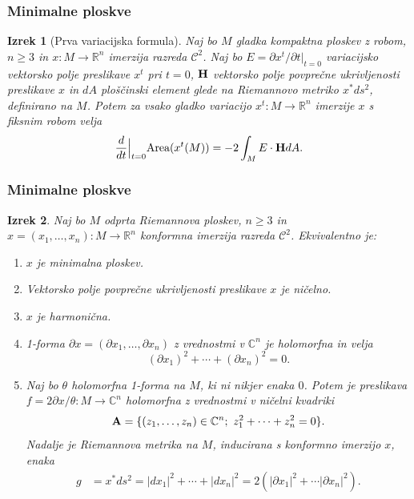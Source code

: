 \documentclass[9pt, table]{beamer}
\newtheorem{izrek}{Izrek}
\newcommand{\R}{\mathbb R}
\newcommand{\C}{\mathbb C}
\begin{document}
\begin{frame}
\frametitle{Minimalne ploskve}

\begin{izrek}[Prva variacijska formula] \label{izr:1-var-formula}
Naj bo $M$ gladka kompaktna ploskev z robom, $n \geq 3$ in $x \colon M \to \R^{n}$ imerzija razreda $\mathcal{C}^2$. Naj bo $E = \partial{x^{t}} / \partial{t}|_{t=0}$ variacijsko vektorsko polje preslikave $x^{t}$ pri $t=0$, $\textbf{\textup{H}}$ vektorsko polje povprečne ukrivljenosti preslikave $x$ in $dA$ ploščinski element glede na Riemannovo metriko $x^{*}ds^2$, definirano na $M$.
Potem za vsako gladko variacijo $x^{t} \colon M \to \R^{n}$ imerzije $x$ s fiksnim robom velja
\begin{equation} \label{eq:1-var-formula}
\frac{d}{dt} \Big|_{t=0} \text{Area}(x^{t}(M)) = -2 \int_{M} {E \cdot \textbf{\textup{H}} dA}.
\end{equation}
\end{izrek}

\end{frame}


\begin{frame}
\frametitle{Minimalne ploskve}

\begin{izrek}
Naj bo $M$ odprta Riemannova ploskev, $n \geq 3$ in $x = (x_1, \dots , x_n) \colon M \to \R^{n}$ konformna imerzija razreda $\mathcal{C}^2$. Ekvivalentno je:
\begin{enumerate}
	\item $x$ je minimalna ploskev.
	\item Vektorsko polje povprečne ukrivljenosti preslikave $x$ je ničelno.
	\item $x$ je harmonična.
	\item 1-forma $ \partial{x} = (\partial{x_1}, \dots , \partial{x_n})$ z vrednostmi v $\C^{n}$ je holomorfna in velja
			\begin{equation}
			(\partial{x_1})^2 + \cdots + (\partial{x_n})^2 = 0.
			\end{equation}
	\item Naj bo $\theta$ holomorfna 1-forma na $M$, ki ni nikjer enaka $0$. Potem je preslikava $f = 2\partial{x} / \theta \colon M \to \C^{n}$ holomorfna z 				vrednostmi v \emph{ničelni kvadriki}
			\begin{equation} \label{ničelna-kvadrika}		
			\textbf{\textup{A}} = \{ (z_1, \dots , z_n) \in \C^{n} ; \ z_{1}^{2} + \cdots + z_{n}^{2} = 0 \}.
			\end{equation}	
		Nadalje je Riemannova metrika na $M$, inducirana s konformno imerzijo $x$, enaka
			\begin{align}
			g &= x^{*} ds^2 = |dx_1|^2 + \cdots + |dx_n|^2 = 2 (|\partial{x_1}|^2 + \cdots |\partial{x_n}|^2).
			\end{align}			
\end{enumerate}
\end{izrek}

\end{frame}
\end{document}
